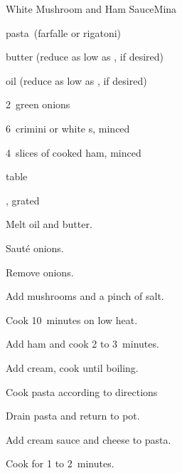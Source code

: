 \begin{recipe}{White Mushroom and Ham Sauce}{Mina}{}

\begin{ingredients}
\item {} pasta~(farfalle or rigatoni)
\item \C{\quarter} butter (reduce as low as , if desired)
\item \C{\half} oil (reduce as low as \C{\quarter}, if desired)
\item 2~green onions
\item 6~crimini or white s, minced
\item 4~slices of cooked ham, minced
\item {} table 
\item {}, grated
\end{ingredients}

\begin{directions}
\item Melt oil and butter.
\item Sauté onions.
\item Remove onions.
\item Add mushrooms and a pinch of salt.
\item Cook 10~minutes on low heat.
\item Add ham and cook 2 to 3~minutes.
\item Add cream, cook until boiling.
\item Cook pasta according to directions
\item Drain pasta and return to pot.
\item Add cream sauce and cheese to pasta.
\item Cook for 1 to 2~minutes.
\end{directions}

\end{recipe}
